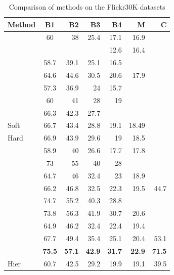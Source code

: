 \begingroup
\renewcommand*{\arraystretch}{1}
\begin{table}[ht]
\caption{Comparison of methods on the Flickr30K datasets}
\begin{tabular}{lcrrrrr}
    \toprule
    Method	&	B1	&	B2	&	B3	&	B4	&	M	&	C	\\
    \midrule
    \citet{Kiros2014_LBL}	&	60	&	38	&	25.4	&	17.1	&	16.9	&		\\
    \citet{Chen2015}	&		&		&		&	12.6	&	16.4	&		\\
    \citet{Donahue2015}	&	58.7	&	39.1	&	25.1	&	16.5	&		&		\\
    \citet{Jia2015}	&	64.6	&	44.6	&	30.5	&	20.6	&	17.9	&		\\
    \citet{Karpathy2015}	&	57.3	&	36.9	&	24	&	15.7	&		&		\\
    \citet{Mao2015_mRNN}	&	60	&	41	&	28	&	19	&		&		\\
    \citet{Vinyals2015}	&	66.3	&	42.3	&	27.7	&		&		&		\\
    \citet{Xu2015} Soft	&	66.7	&	43.4	&	28.8	&	19.1	&	18.49	&		\\
    \citet{Xu2015} Hard	&	66.9	&	43.9	&	29.6	&	19	&	18.5	&		\\
    \citet{Oruganti2016}	&	58.9	&	40	&	26.6	&	17.7	&	17.8	&		\\
    \citet{Wu2016}	&	73	&	55	&	40	&	28	&		&		\\
    \citet{You2016}	&	64.7	&	46	&	32.4	&	23	&	18.9	&		\\
    \citet{Chen2017_SCA}	&	66.2	&	46.8	&	32.5	&	22.3	&	19.5	&	44.7	\\
    \citet{Gan2017_SCN}	&	74.7	&	55.2	&	40.3	&	28.8	&		&		\\
    \citet{Gu2017}	&	73.8	&	56.3	&	41.9	&	30.7	&	20.6	&		\\
    \citet{Fu2017}	&	64.9	&	46.2	&	32.4	&	22.4	&	19.4	&		\\
    \citet{Lu2017}	&	67.7	&	49.4	&	35.4	&	25.1	&	20.4	&	53.1	\\
    \citet{Li2018_VS-LSTM}	&	\textbf{75.5}	&	\textbf{57.1}	&	\textbf{42.9}	&	\textbf{31.7}	&	\textbf{22.9}	&	\textbf{71.5}	\\
    \citet{Wang2018} Hier	&	60.7	&	42.5	&	29.2	&	19.9	&	19.1	&	39.5	\\
    \bottomrule
\end{tabular}
\label{tab:benchmarks_flickr30k}
\end{table}
\endgroup

